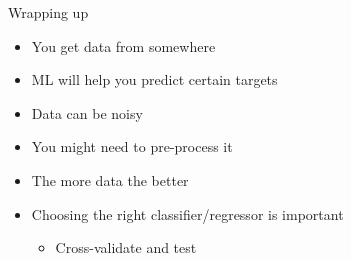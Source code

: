 \documentclass[obeyspaces,aspectratio=43]{beamer}
\providecommand{\tightlist}{%
  \setlength{\itemsep}{0pt}\setlength{\parskip}{0pt}}
\begin{document}
\begin{frame}{Wrapping up}

\begin{itemize}
\tightlist
\item
  You get data from somewhere
\item
  ML will help you predict certain targets
\item
  Data can be noisy
\item
  You might need to pre-process it
\item
  The more data the better
\item
  Choosing the right classifier/regressor is important

  \begin{itemize}
  \tightlist
  \item
    Cross-validate and test
  \end{itemize}
\end{itemize}

\end{frame}
\end{document}
